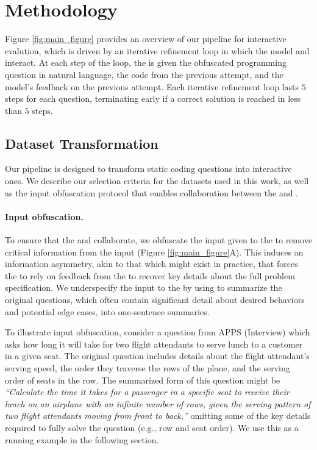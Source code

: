 
\section{Methodology}
Figure \ref{fig:main_figure} provides an overview of our pipeline for interactive evalution, which is driven by an iterative refinement loop in which the \user{} model and \cm{}  interact.
At each step of the loop, the \cm{} is given the obfuscated programming question in natural language, the code from the previous attempt, and the \user{} model's feedback on the previous attempt. Each iterative refinement loop lasts $5$ steps for each question, terminating early if a correct solution is reached in less than $5$ steps.
 

\subsection{Dataset Transformation}
\label{sec:dataset_transform}
Our pipeline is designed to transform static coding questions into interactive ones. 
We describe our selection criteria for the datasets used in this work, as well as the input obfuscation protocol that enables collaboration between the \user{} and \cm{}.



\paragraph{Input obfuscation.} 
To ensure that the \user{} and \cm{} collaborate, we obfuscate the input given to the \cm{} to remove critical information from the input (Figure \ref{fig:main_figure}A). 
This induces an information asymmetry, akin to that which might exist in practice, that forces the \cm{} to rely on feedback from the \user{} to recover key details about the full problem specification.
We underspecify the input to the \cm{} by using \sonnet{} to summarize the original questions, which often contain significant detail about desired behaviors and potential edge cases, into one-sentence summaries.



To illustrate input obfuscation, consider a question from APPS (Interview) which asks how long it will take for two flight attendants to serve lunch to a customer in a given seat. The original question includes details about the flight attendant's serving speed, the order they traverse the rows of the plane, and the serving order of seats in the row. 
The summarized form of this question might be \textit{``Calculate the time it takes for a passenger in a specific seat to receive their lunch on an airplane with an infinite number of rows, given the serving pattern of two flight attendants moving from front to back,''} omitting some of the key details required to fully solve the question (e.g., row and seat order).
We use this as a running example in the following section.


